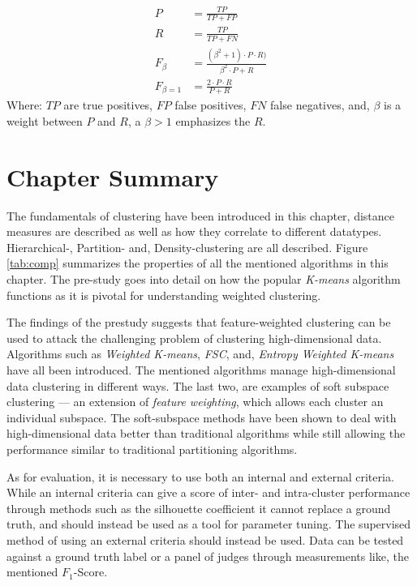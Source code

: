 \documentclass[../report.tex]{subfiles}
\begin{document}
\begin{align}
  \label{eq:precision}
  P &= \frac{TP}{TP+FP} \\
  \label{eq:recall}
  R &= \frac{TP}{TP+FN} \\
  \label{eq:f-measure}
  F_\beta &= \frac{(\beta^2 + 1) \cdot P \cdot R)}{\beta^2 \cdot P + R} \\
  \label{eq:f1-measure}
  F_{\beta = 1} &= \frac{2 \cdot P \cdot R}{P + R}
\end{align}
Where:\newline
$TP$ are true positives, $FP$ false positives, $FN$ false negatives, and, $\beta$ is a weight between $P$ and $R$, a $\beta > 1$ emphasizes the $R$.

\section{Chapter Summary}
The fundamentals of clustering have been introduced in this chapter, distance measures are described as well as how they correlate to different datatypes. Hierarchical-, Partition- and, Density-clustering are all described. Figure \ref{tab:comp} summarizes the properties of all the mentioned algorithms in this chapter. The pre-study goes into detail on how the popular \textit{K-means} algorithm functions as it is pivotal for understanding weighted clustering.

The findings of the prestudy suggests that feature-weighted clustering can be used to attack the challenging problem of clustering high-dimensional data. Algorithms such as \textit{Weighted K-means}, \textit{FSC}, and, \textit{Entropy Weighted K-means} have all been introduced.  The mentioned algorithms manage high-dimensional data clustering in different ways. The last two, are examples of soft subspace clustering --- an extension of \textit{feature weighting}, which allows each cluster an individual subspace. The soft-subspace methods have been shown to deal with high-dimensional data better than traditional algorithms while still allowing the performance similar to traditional partitioning algorithms.

As for evaluation, it is necessary to use both an internal and external criteria. While an internal criteria can give a score of inter- and intra-cluster performance through methods such as the silhouette coefficient it cannot replace a ground truth, and should instead be used as a tool for parameter tuning. The supervised method of using an external criteria should instead be used. Data can be tested against a ground truth label or a panel of judges through measurements like, the mentioned $F_1$-Score.
\end{document}
